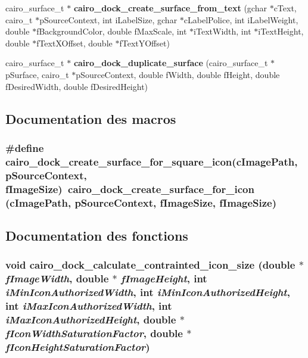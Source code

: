 \begin{CompactItemize}
\item 
cairo\_\-surface\_\-t $\ast$ {\bf cairo\_\-dock\_\-create\_\-surface\_\-from\_\-text} (gchar $\ast$cText, cairo\_\-t $\ast$pSourceContext, int iLabelSize, gchar $\ast$cLabelPolice, int iLabelWeight, double $\ast$fBackgroundColor, double fMaxScale, int $\ast$iTextWidth, int $\ast$iTextHeight, double $\ast$fTextXOffset, double $\ast$fTextYOffset)
\item 
cairo\_\-surface\_\-t $\ast$ {\bf cairo\_\-dock\_\-duplicate\_\-surface} (cairo\_\-surface\_\-t $\ast$pSurface, cairo\_\-t $\ast$pSourceContext, double fWidth, double fHeight, double fDesiredWidth, double fDesiredHeight)
\end{CompactItemize}


\subsection{Documentation des macros}
\subsubsection{\setlength{\rightskip}{0pt plus 5cm}\#define cairo\_\-dock\_\-create\_\-surface\_\-for\_\-square\_\-icon(cImagePath, pSourceContext, fImageSize)~cairo\_\-dock\_\-create\_\-surface\_\-for\_\-icon (cImagePath, pSourceContext, fImageSize, fImageSize)}\label{cairo-dock-surface-factory_8h_5a46860771e8a7ec70e00ac7f894efbf}




\subsection{Documentation des fonctions}
\subsubsection{\setlength{\rightskip}{0pt plus 5cm}void cairo\_\-dock\_\-calculate\_\-contrainted\_\-icon\_\-size (double $\ast$ {\em fImageWidth}, double $\ast$ {\em fImageHeight}, int {\em iMinIconAuthorizedWidth}, int {\em iMinIconAuthorizedHeight}, int {\em iMaxIconAuthorizedWidth}, int {\em iMaxIconAuthorizedHeight}, double $\ast$ {\em fIconWidthSaturationFactor}, double $\ast$ {\em fIconHeightSaturationFactor})}\label{cairo-dock-surface-factory_8h_4c7687cc4b5a7ff06680a60d493193d9}


